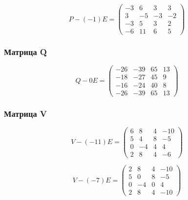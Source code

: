 \documentclass[12pt, a4paper]{article}
\begin{document}
    \begin{equation}
        P - (-1) E = \left(\begin{matrix}
            -3 & 6 & 3 & 3 \\
            3 & -5 & -3 & -2 \\
            -3 & 5 & 3 & 2 \\
            -6 & 11 & 6 & 5
        \end{matrix}\right)
    \end{equation}




    \subsubsection{Матрица Q}

    \begin{equation}
        Q - 0 E = \left(\begin{matrix}
            -26 & -39 & 65 & 13 \\
            -18 & -27 & 45 & 9 \\
            -16 & -24 & 40 & 8 \\
            -26 & -39 & 65 & 13
        \end{matrix}\right)
    \end{equation}




    \subsubsection{Матрица V}

    \begin{equation}
        V - (-11) E = \left(\begin{matrix}
            6 & 8 & 4 & -10 \\
            5 & 4 & 8 & -5 \\
            0 & -4 & 4 & 4 \\
            2 & 8 & 4 & -6
        \end{matrix}\right)
    \end{equation}

    \begin{equation}
        V - (-7) E = \left(\begin{matrix}
            2 & 8 & 4 & -10 \\
            5 & 0 & 8 & -5 \\
            0 & -4 & 0 & 4 \\
            2 & 8 & 4 & -10
        \end{matrix}\right)
    \end{equation}
\end{document}

